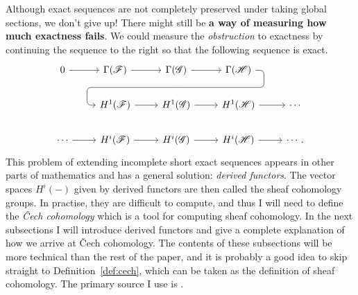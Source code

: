 Although exact sequences are not completely preserved under taking
global sections, we don't give up! There might still be \textbf{a way of
measuring how much exactness fails}. We could measure the
\emph{obstruction} to exactness by continuing the sequence to the right
so that the following sequence is exact.
\[
\begin{tikzcd}
  0 \rar & \Gamma(\mathscr{F}) \rar & \Gamma(\mathscr{G})
  \rar\dar[phantom, ""{coordinate, name=Z}] & \Gamma(\mathscr{H})
  \arrow[rounded corners, to path={ -- ([xshift=2ex]\tikztostart.east)
    |- (Z) -| ([xshift=-2ex]\tikztotarget.west) -- (\tikztotarget)},
  overlay]{dll} & \\
    & H^{1}(\mathscr{F}) \rar & H^{1}(\mathscr{G})
  \rar & H^{1}(\mathscr{H}) \rar & \cdots \\
  \cdots \rar& H^{i}(\mathscr{F}) \rar & H^{i}(\mathscr{G})
  \rar & H^{i}(\mathscr{H}) \rar & \cdots.
\end{tikzcd}
\]
This problem of extending incomplete short exact sequences appears
in other parts of mathematics and has a general solution: \emph{derived functors}.
The vector spaces $H^{i}(-)$ given by
derived functors are then called the sheaf cohomology groups. In practise,
they are difficult to compute, and thus I will need to define the
\emph{\v Cech cohomology} which is a tool for computing sheaf cohomology.
In the next subsections I will introduce derived functors and give a complete
explanation of how we arrive at \v Cech cohomology. The contents of these
subsections will be more technical than the rest of the paper, and it is
probably a good idea to skip straight to Definition~\ref{def:cech},
which can be taken as the definition of sheaf cohomology. The
primary source I use is \cite{vakil}.

